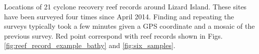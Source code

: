 \label{fig:sitemap} Locations of 21 cyclone recovery reef records around Lizard Island. These sites have been surveyed four times since April 2014. Finding and repeating the surveys typically took a few minutes given a GPS coordinate and a mosaic of the previous survey. Red point correspond with reef records shown in Figs. \ref{fig:reef_record_example_bathy} and \ref{fig:six_samples}.